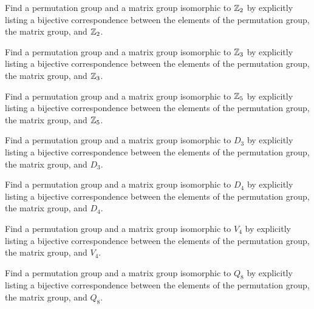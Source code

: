 \documentclass{ximera}
\begin{document}
\begin{exercise}
  Find a permutation group and a matrix group isomorphic to $\mathbb Z_2$ by
  explicitly listing a bijective correspondence between the elements
  of the permutation group, the matrix group, and $\mathbb Z_2$.
\end{exercise}


\begin{exercise}
  Find a permutation group and a matrix group isomorphic to $\mathbb Z_3$ by
  explicitly listing a bijective correspondence between the elements
  of the permutation group, the matrix group, and $\mathbb Z_3$.
\end{exercise}


\begin{exercise}
  Find a permutation group and a matrix group isomorphic to $\mathbb Z_5$ by
  explicitly listing a bijective correspondence between the elements
  of the permutation group, the matrix group, and $\mathbb Z_5$.
\end{exercise}



\begin{exercise}
  Find a permutation group and a matrix group isomorphic to $D_3$ by
  explicitly listing a bijective correspondence between the elements
  of the permutation group, the matrix group, and $D_3$.
\end{exercise}


\begin{exercise}
  Find a permutation group and a matrix group isomorphic to $D_4$ by
  explicitly listing a bijective correspondence between the elements
  of the permutation group, the matrix group, and $D_4$.
\end{exercise}



\begin{exercise}
  Find a permutation group and a matrix group isomorphic to $V_4$ by
  explicitly listing a bijective correspondence between the elements
  of the permutation group, the matrix group, and $V_4$.
\end{exercise}


\begin{exercise}
  Find a permutation group and a matrix group isomorphic to $Q_8$ by
  explicitly listing a bijective correspondence between the elements
  of the permutation group, the matrix group, and $Q_8$.
\end{exercise}
\end{document}
